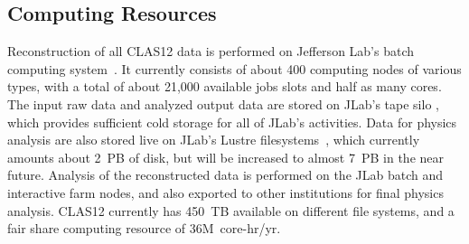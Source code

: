 \subsection{Computing Resources}

Reconstruction of all CLAS12 data is performed on Jefferson Lab's batch computing system~\cite{jlab-batch-farm}.
It currently consists of about 400 computing nodes of various types, with a total of about 21,000 available jobs
slots and half as many cores.  The input raw data and analyzed output data are stored on JLab's tape silo
\cite{jlab-tape-silo}, which provides sufficient cold storage for all of JLab's activities.  Data for physics analysis are
also stored live on JLab's Lustre filesystems~\cite{jlab-lustre}, which currently amounts about 2~PB of disk, but will
be increased to almost 7~PB in the near future. Analysis of the reconstructed data is performed on the JLab batch and
interactive farm nodes, and also exported to other institutions for final physics analysis. CLAS12 currently has 450~TB
available on different file systems, and a fair share computing resource of 36M~core-hr/yr.
